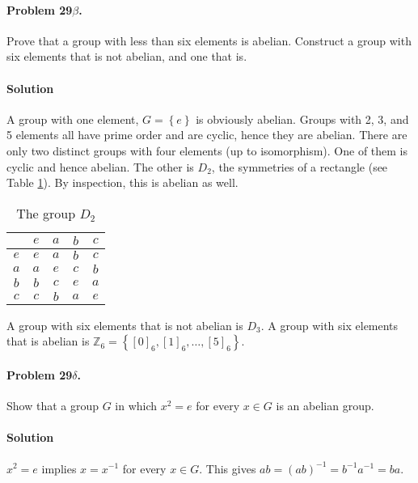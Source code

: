 \paragraph{Problem 29$\beta$.}
Prove that a group with less than six elements is abelian. Construct a group
with six elements that is not abelian, and one that is.

\paragraph*{Solution}
A group with one element, $G = \left\{ e \right\}$ is obviously abelian. Groups
with 2, 3, and 5 elements all have prime order and are cyclic, hence they are
abelian. There are only two distinct groups with four elements (up to isomorphism).
One of them is cyclic and hence abelian. The other is $D_2$, the symmetries of
a rectangle (see Table \ref{table:group_d2}). By inspection, this is abelian
as well.

\begin{table}[ht]
\begin{center}
\begin{tabular}[ht]{c|cccc}
    & $e$ & $a$ & $b$ & $c$ \\
\hline
$e$ & $e$ & $a$ & $b$ & $c$ \\
$a$ & $a$ & $e$ & $c$ & $b$ \\
$b$ & $b$ & $c$ & $e$ & $a$ \\
$c$ & $c$ & $b$ & $a$ & $e$ \\
\end{tabular}
\end{center}
\caption{The group $D_2$}
\label{table:group_d2}
\end{table}

A group with six elements that is not abelian is $D_3$. A group with six
elements that is abelian is $\mathbb{Z}_6 = \left\{[0]_6, [1]_6, \dots ,[5]_6 \right\}$.

\paragraph{Problem 29$\delta$.}
Show that a group $G$ in which $x^2 = e$ for every $ x \in G$ is an abelian group.

\paragraph*{Solution}
$x^2 = e $ implies $x = x^{-1}$ for every $ x \in G$.
This gives $ ab = (ab)^{-1} = b^{-1} a^{-1} = ba$.


